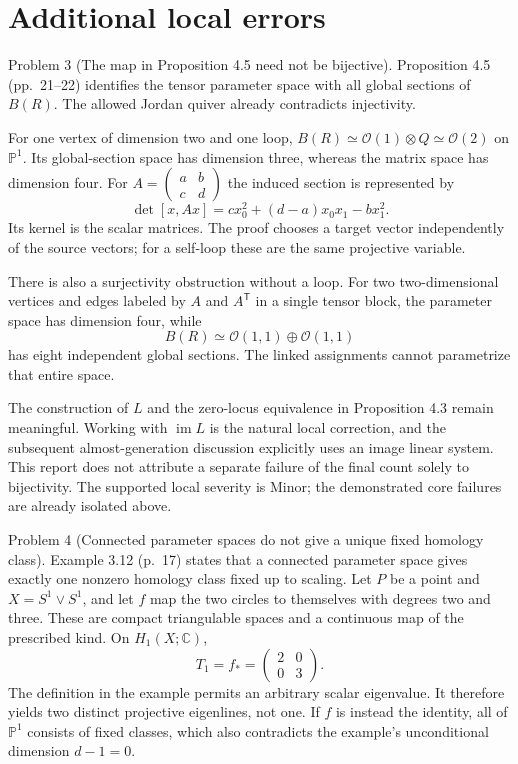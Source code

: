 \documentclass[10pt]{article}
\begin{document}
\section*{Additional local errors}
Problem 3 (The map in Proposition 4.5 need not be bijective).  Proposition 4.5 (pp. 21–22) identifies the tensor parameter space with all global sections of \(B(R)\). The allowed Jordan quiver already contradicts injectivity.\par
For one vertex of dimension two and one loop, \(B(R)\simeq\mathcal O(1)\otimes Q\simeq\mathcal O(2)\) on \(\mathbb P^1\). Its global-section space has dimension three, whereas the matrix space has dimension four. For \(A=\left(\begin{smallmatrix}a&b\\c&d\end{smallmatrix}\right)\) the induced section is represented by \[\det[x,Ax]=cx_0^2+(d-a)x_0x_1-bx_1^2.\] Its kernel is the scalar matrices. The proof chooses a target vector independently of the source vectors; for a self-loop these are the same projective variable.\par
There is also a surjectivity obstruction without a loop. For two two-dimensional vertices and edges labeled by \(A\) and \(A^{\mathsf T}\) in a single tensor block, the parameter space has dimension four, while \[B(R)\simeq \mathcal O(1,1)\oplus\mathcal O(1,1)\] has eight independent global sections. The linked assignments cannot parametrize that entire space.\par
The construction of \(L\) and the zero-locus equivalence in Proposition 4.3 remain meaningful. Working with \(\operatorname{im}L\) is the natural local correction, and the subsequent almost-generation discussion explicitly uses an image linear system. This report does not attribute a separate failure of the final count solely to bijectivity. The supported local severity is Minor; the demonstrated core failures are already isolated above.\par
Problem 4 (Connected parameter spaces do not give a unique fixed homology class).  Example 3.12 (p. 17) states that a connected parameter space gives exactly one nonzero homology class fixed up to scaling. Let \(P\) be a point and \(X=S^1\vee S^1\), and let \(f\) map the two circles to themselves with degrees two and three. These are compact triangulable spaces and a continuous map of the prescribed kind. On \(H_1(X;\mathbb C)\), \[T_1=f_*=\begin{pmatrix}2&0\\0&3\end{pmatrix}.\] The definition in the example permits an arbitrary scalar eigenvalue. It therefore yields two distinct projective eigenlines, not one. If \(f\) is instead the identity, all of \(\mathbb P^1\) consists of fixed classes, which also contradicts the example’s unconditional dimension \(d-1=0\).\par
\end{document}
